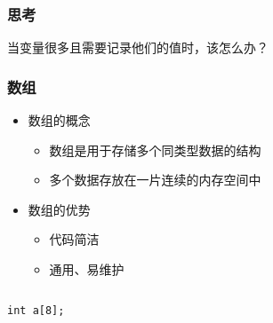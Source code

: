 \begin{frame}[fragile]
    \frametitle{思考}

    \begin{block}{}
        \vspace{.5cm}
        \begin{center}
            当变量很多且需要记录他们的值时，该怎么办？
        \end{center}
        \vspace{.5cm}
    \end{block}
\end{frame}

\begin{frame}[fragile]
    \frametitle{数组}

    \begin{overlayarea}{\textwidth}{.55\textheight}
        \begin{itemize}
            \item<1-> 数组的概念

                \begin{itemize}
                    \item 数组是用于存储多个同类型数据的结构
                    \item 多个数据存放在一片连续的内存空间中
                \end{itemize}

            \item<2-> 数组的优势

                \begin{itemize}
                    \item 代码简洁
                    \item 通用、易维护
                \end{itemize}
        \end{itemize}
    \end{overlayarea}

    \begin{columns}

        \lstinline|int a[8];|


\end{columns}
\end{frame}
